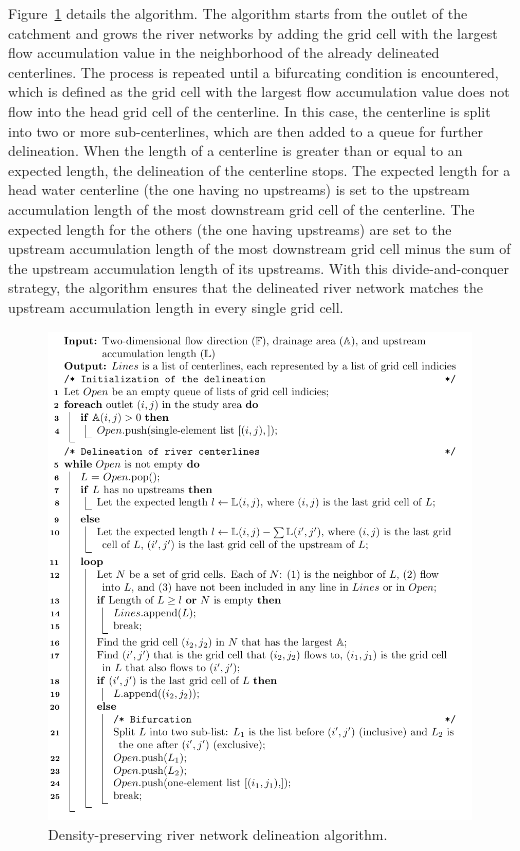\documentclass[water,article,submit,pdftex,moreauthors]{Definitions/mdpi}
\begin{document}
Figure~\ref{fig:algorithm} details the algorithm. The algorithm starts from the outlet of the catchment and grows the river networks by adding the grid cell with the largest flow accumulation value in the neighborhood of the already delineated centerlines. The process is repeated until a bifurcating condition is encountered, which is defined as the grid cell with the largest flow accumulation value does not flow into the head grid cell of the centerline. In this case, the centerline is split into two or more sub-centerlines, which are then added to a queue for further delineation. When the length of a centerline is greater than or equal to an expected length, the delineation of the centerline stops. The expected length for a head water centerline (the one having no upstreams) is set to the upstream accumulation length of the most downstream grid cell of the centerline. The expected length for the others (the one having upstreams) are set to the upstream accumulation length of the most downstream grid cell minus the sum of the upstream accumulation length of its upstreams. With this divide-and-conquer strategy, the algorithm ensures that the delineated river network matches the upstream accumulation length in every single grid cell.

\begin{figure}[H]
  \includegraphics[width=\textwidth]{algorithm.pdf}
  \caption{Density-preserving river network delineation algorithm.\label{fig:algorithm}}
\end{figure}
\end{document}
